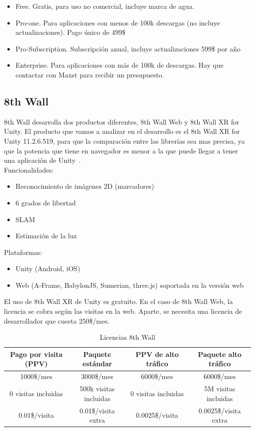 \begin{itemize}
\item Free. Gratis, para uso no comercial, incluye marca de agua.
\item Pro-one. Para aplicaciones con menos de 100k descargas (no incluye actualizaciones). Pago único de 499\$ 
\item Pro-Subscription. Subscripción anual, incluye actualizaciones 599\$ por año
\item Enterprise. Para aplicaciones con más de 100k de descargas. Hay que contactar con Maxst para recibir un presupuesto.
\end{itemize}


\subsection{8th Wall}


8th Wall desarrolla dos productos diferentes, 8th Wall Web y 8th Wall XR for Unity. El producto que vamos a analizar en el desarrollo es el 8th Wall XR for Unity 11.2.6.519, para que la comparación entre las librerías sea mas precisa, ya que la potencia que tiene en navegador es menor a la que puede llegar a tener una aplicación de Unity~\cite{8thWall}.\\

Funcionalidades:
\begin{itemize}
\item Reconocimiento de imágenes 2D (marcadores)
\item 6 grados de libertad
\item SLAM
\item Estimación de la luz
\end{itemize}

Plataformas:
\begin{itemize}
\item Unity (Android, iOS)
\item Web (A-Frame, BabylonJS, Sumerian, three.js) soportada en la versión web
\end{itemize}
El uso de 8th Wall XR de Unity es gratuito. En el caso de 8th Wall Web, la licencia se cobra según las visitas en la web. Aparte, se necesita una licencia de desarrollador que cuesta 250\$/mes.\\

\begin{table}[H]
    \centering
    \begin{tabular}{c c c c}
    \toprule
        Pago por visita (PPV)&	Paquete estándar&PPV de alto tráfico&Paquete alto tráfico \\
         \midrule
        1000\$/mes	& 3000\$/mes	& 6000\$/mes &	6000\$/mes \\  
 
        0 visitas incluidas &	500k visitas incluidas&	0 visitas incluidas	&5M visitas incluidas\\
 
        0.01\$/visita&	0.01\$/visita extra&	0.0025\$/visita&	0.0025\$/visita extra\\
      \bottomrule
    \end{tabular}
    \caption{Licencias 8th Wall}
    \label{tab:8thwallLicenses}
\end{table}


